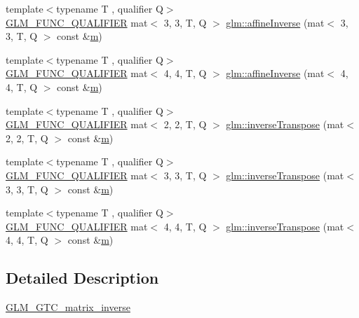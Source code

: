 \begin{DoxyCompactItemize}
\item 
{\footnotesize template$<$typename T , qualifier Q$>$ }\\\hyperlink{setup_8hpp_a33fdea6f91c5f834105f7415e2a64407}{G\+L\+M\+\_\+\+F\+U\+N\+C\+\_\+\+Q\+U\+A\+L\+I\+F\+I\+ER} mat$<$ 3, 3, T, Q $>$ \hyperlink{namespaceglm_ab06878a5dc78d95a856e4d91fcbc8e8e}{glm\+::affine\+Inverse} (mat$<$ 3, 3, T, Q $>$ const \&\hyperlink{_s_d_l__opengl__glext_8h_af593500c283bf1a787a6f947f503a5c2}{m})
\item 
{\footnotesize template$<$typename T , qualifier Q$>$ }\\\hyperlink{setup_8hpp_a33fdea6f91c5f834105f7415e2a64407}{G\+L\+M\+\_\+\+F\+U\+N\+C\+\_\+\+Q\+U\+A\+L\+I\+F\+I\+ER} mat$<$ 4, 4, T, Q $>$ \hyperlink{namespaceglm_a9dcf422db11feb085e18abca92d8f3e3}{glm\+::affine\+Inverse} (mat$<$ 4, 4, T, Q $>$ const \&\hyperlink{_s_d_l__opengl__glext_8h_af593500c283bf1a787a6f947f503a5c2}{m})
\item 
{\footnotesize template$<$typename T , qualifier Q$>$ }\\\hyperlink{setup_8hpp_a33fdea6f91c5f834105f7415e2a64407}{G\+L\+M\+\_\+\+F\+U\+N\+C\+\_\+\+Q\+U\+A\+L\+I\+F\+I\+ER} mat$<$ 2, 2, T, Q $>$ \hyperlink{namespaceglm_a616278b85e66d08597d9d24eedf27258}{glm\+::inverse\+Transpose} (mat$<$ 2, 2, T, Q $>$ const \&\hyperlink{_s_d_l__opengl__glext_8h_af593500c283bf1a787a6f947f503a5c2}{m})
\item 
{\footnotesize template$<$typename T , qualifier Q$>$ }\\\hyperlink{setup_8hpp_a33fdea6f91c5f834105f7415e2a64407}{G\+L\+M\+\_\+\+F\+U\+N\+C\+\_\+\+Q\+U\+A\+L\+I\+F\+I\+ER} mat$<$ 3, 3, T, Q $>$ \hyperlink{namespaceglm_a5c1e146d84cfb99e35cfbaf69ecd37a5}{glm\+::inverse\+Transpose} (mat$<$ 3, 3, T, Q $>$ const \&\hyperlink{_s_d_l__opengl__glext_8h_af593500c283bf1a787a6f947f503a5c2}{m})
\item 
{\footnotesize template$<$typename T , qualifier Q$>$ }\\\hyperlink{setup_8hpp_a33fdea6f91c5f834105f7415e2a64407}{G\+L\+M\+\_\+\+F\+U\+N\+C\+\_\+\+Q\+U\+A\+L\+I\+F\+I\+ER} mat$<$ 4, 4, T, Q $>$ \hyperlink{namespaceglm_a54ac106dd048ffce709a48b2ec2b9052}{glm\+::inverse\+Transpose} (mat$<$ 4, 4, T, Q $>$ const \&\hyperlink{_s_d_l__opengl__glext_8h_af593500c283bf1a787a6f947f503a5c2}{m})
\end{DoxyCompactItemize}


\subsection{Detailed Description}
\hyperlink{group__gtc__matrix__inverse}{G\+L\+M\+\_\+\+G\+T\+C\+\_\+matrix\+\_\+inverse} 